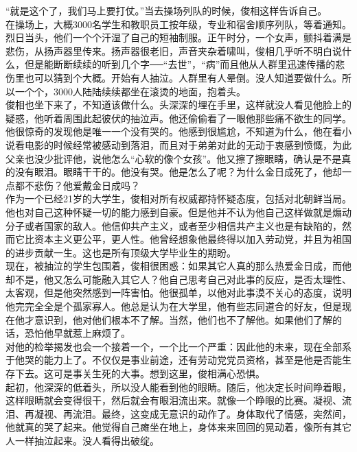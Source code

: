 “就是这个了，我们马上要打仗。”当去操场列队的时候，俊相这样告诉自己。\\

在操场上，大概3000名学生和教职员工按年级，专业和宿舍顺序列队，等着通知。烈日当头，他们一个个汗湿了自己的短袖制服。正午时分，一个女声，颤抖着满是悲伤，从扬声器里传来。扬声器很老旧，声音夹杂着啸叫，俊相几乎听不明白说什么，但是能断断续续的听到几个字──“去世”，“病”而且他从人群里迅速传播的悲伤里也可以猜到个大概。开始有人抽泣。人群里有人晕倒。没人知道要做什么。所以一个个，3000人陆陆续续都坐在滚烫的地面，抱着头。\\

俊相也坐下来了，不知道该做什么。头深深的埋在手里，这样就没人看见他脸上的疑惑，他听着周围此起彼伏的抽泣声。他还偷偷看了一眼他那些痛不欲生的同学。他很惊奇的发现他是唯一一个没有哭的。他感到很尴尬，不知道为什么，他在看小说看电影的时候经常被感动到落泪，而且对于弟弟对此的无动于衷感到愤慨，为此父亲也没少批评他，说他怎么“心软的像个女孩”。他又擦了擦眼睛，确认是不是真的没有眼泪。眼睛干干的。他没有哭。他是怎么了呢？为什么金日成死了，他却一点都不悲伤？他爱戴金日成吗？\\

作为一个已经21岁的大学生，俊相对所有权威都持怀疑态度，包括对北朝鲜当局。他也对自己这种怀疑一切的能力感到自豪。但是他并不认为他自己这样做就是煽动分子或者国家的敌人。他信仰共产主义，或者至少相信共产主义也是有缺陷的，然而它比资本主义更公平，更人性。他曾经想象他最终得以加入劳动党，并且为祖国的进步贡献一生。这也是所有顶级大学毕业生的期盼。\\

现在，被抽泣的学生包围着，俊相很困惑：如果其它人真的那么热爱金日成，而他却不是，他又怎么可能融入其它人？他自己思考自己对此事的反应，是否太理性、太客观，但是他突然感到一阵害怕。他很孤单，以他对此事漠不关心的态度，说明他完完全全是个孤家寡人。他总是认为在大学里，他有些志同道合的好友，但是现在他才意识到，他对他们根本不了解。当然，他们也不了解他。如果他们了解的话，恐怕他早就惹上麻烦了。\\

对他的检举揭发也会一个接着一个，一个比一个严重：因此他的未来，现在全部系于他哭的能力上了。不仅仅是事业前途，还有劳动党党员资格，甚至是他是否能生存下去。这可是事关生死的大事。想到这里，俊相满心恐惧。\\

起初，他深深的低着头，所以没人能看到他的眼睛。随后，他决定长时间睁着眼，这样眼睛就会变得很干，然后就会有眼泪流出来。就像一个睁眼的比赛。凝视、流泪、再凝视、再流泪。最终，这变成无意识的动作了。身体取代了情感，突然间，他就真的哭了起来。他觉得自己瘫坐在地上，身体来来回回的晃动着，像所有其它人一样抽泣起来。没人看得出破绽。\\

